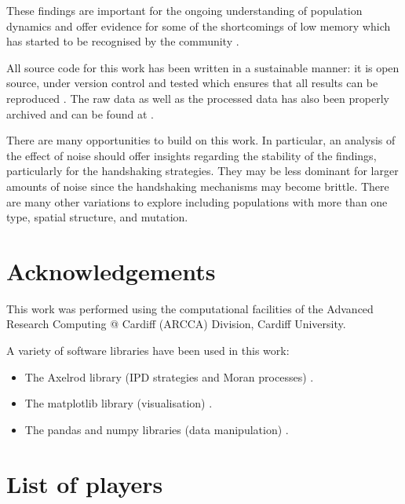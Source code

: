 \documentclass{article}
\begin{document}
These findings are important for the ongoing understanding of
population dynamics and offer evidence for some of the shortcomings of low
memory which has started to be recognised by the community \cite{Hilbe2017}.

All source code for this work has been written in a sustainable manner: it is
open source, under version control and tested which ensures that all results can
be reproduced \cite{Prlic2012, Sandve2013, Wilson2014}. The raw data as well as
the processed data has also been properly archived and can be found
at \cite{data}.

There are many opportunities to build on this work. In particular, an analysis
of the effect of noise should offer insights regarding the stability of the findings,
particularly for the handshaking strategies. They may be less dominant for
larger amounts of noise since the handshaking mechanisms may become brittle.
There are many other variations to explore including populations with more
than one type, spatial structure, and mutation.

\section*{Acknowledgements}

This work was performed using the computational facilities of the Advanced
Research Computing @ Cardiff (ARCCA) Division, Cardiff University.

A variety of software libraries have been used in this work:

\begin{itemize}
    \item The Axelrod library (IPD strategies and Moran processes)
        \cite{axelrodproject}.
    \item The matplotlib library (visualisation) \cite{hunter2007matplotlib}.
    \item The pandas and numpy libraries (data manipulation)
        \cite{mckinney2010data, walt2011numpy}.
\end{itemize}

\printbibliography

\appendix

\section{List of players}\label{app:list_of_players}

\begin{multicols}{2}
	\begin{enumerate}
		
	\end{enumerate}
\end{multicols}
\end{document}

